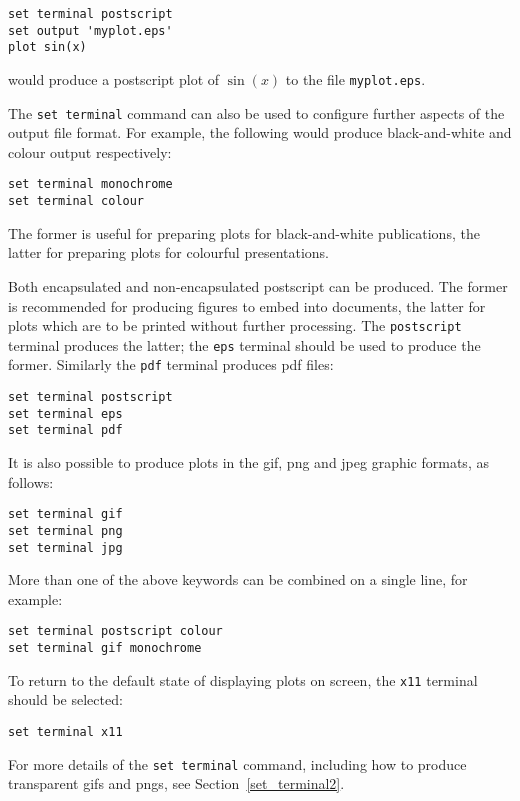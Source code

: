 \documentclass[a4paper,onecolumn,11pt]{book}
\begin{document}
\begin{verbatim}
set terminal postscript
set output 'myplot.eps'
plot sin(x)
\end{verbatim}

\noindent would produce a postscript plot of $\sin(x)$ to the file
\texttt{myplot.eps}.

The \texttt{set terminal} command can also be used to configure further aspects
of the output file format. For example, the following would produce
black-and-white and colour output respectively:

\begin{verbatim}
set terminal monochrome
set terminal colour
\end{verbatim}

\noindent The former is useful for preparing plots for black-and-white
publications, the latter for preparing plots for colourful presentations.

Both encapsulated and non-encapsulated postscript can be produced. The former
is recommended for producing figures to embed into documents, the latter for
plots which are to be printed without further processing. The
\texttt{postscript} terminal produces the latter; the \texttt{eps} terminal
should be used to produce the former.  Similarly the \texttt{pdf} terminal
produces pdf files:

\begin{verbatim}
set terminal postscript
set terminal eps
set terminal pdf
\end{verbatim}

It is also possible to produce plots in the gif, png and jpeg graphic formats,
as follows:

\begin{verbatim}
set terminal gif
set terminal png
set terminal jpg
\end{verbatim}

More than one of the above keywords can be combined on a single line, for
example:

\begin{verbatim}
set terminal postscript colour
set terminal gif monochrome
\end{verbatim}

To return to the default state of displaying plots on screen, the \texttt{x11}
terminal should be selected:

\begin{verbatim}
set terminal x11
\end{verbatim}

For more details of the \texttt{set terminal} command, including how to produce
transparent gifs and pngs, see Section~\ref{set_terminal2}.
\end{document}
